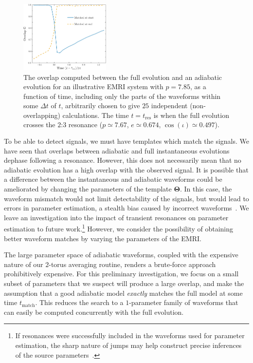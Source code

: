 \documentclass[aps,prd,amsfonts,amssymb,amsmath,nofootinbib,showpacs,superscriptaddress,twocolumn,floatfix]{revtex4-1}
\newcommand{\sub}[1]{\ensuremath{_\mathrm{#1}}}
\begin{document}
\begin{figure}
\centering
\includegraphics[width=0.4\textwidth]{Fig_overlap}
\caption{\label{fig:overlap-dephasing}The overlap computed between the full evolution and an adiabatic evolution for an illustrative EMRI system with $p=7.85$, as a function of time, including only the parts of the waveforms within some $\Delta t$ of $t$, arbitrarily chosen to give $25$ independent (non-overlapping) calculations. The time $t = t\sub{res}$ is when the full evolution crosses the $2$:$3$ resonance ($p \simeq 7.67$, $e \simeq 0.674$, $\cos(\iota) \simeq 0.497$).}
\end{figure}

To be able to detect signals, we must have templates which match the signals. We have seen that overlaps between adiabatic and full instantaneous evolutions dephase following a resonance. However, this does not necessarily mean that no adiabatic evolution has a high overlap with the observed signal. It is possible that a difference between the instantaneous and adiabatic waveforms could be ameliorated by changing the parameters of the template $\boldsymbol{\Theta}$. In this case, the waveform mismatch would not limit detectability of the signals, but would lead to errors in parameter estimation, a stealth bias caused by incorrect waveforms~\cite{Cutler2007}. We leave an investigation into the impact of transient resonances on parameter estimation to future work.\footnote{If resonances were successfully included in the waveforms used for parameter estimation, the sharp nature of jumps may help construct precise inferences of the source parameters~\cite{Mandel2014}.} However, we consider the possibility of obtaining better waveform matches by varying the parameters of the EMRI.

The large parameter space of adiabatic waveforms, coupled with the expensive nature of our $2$-torus averaging routine, renders a brute-force approach prohibitively expensive. For this preliminary investigation, we focus on a small subset of parameters that we suspect will produce a large overlap, and make the assumption that a good adiabatic model \emph{exactly} matches the full model at some time $t\sub{match}$. This reduces the search to a $1$-parameter family of waveforms that can easily be computed concurrently with the full evolution.
\end{document}
